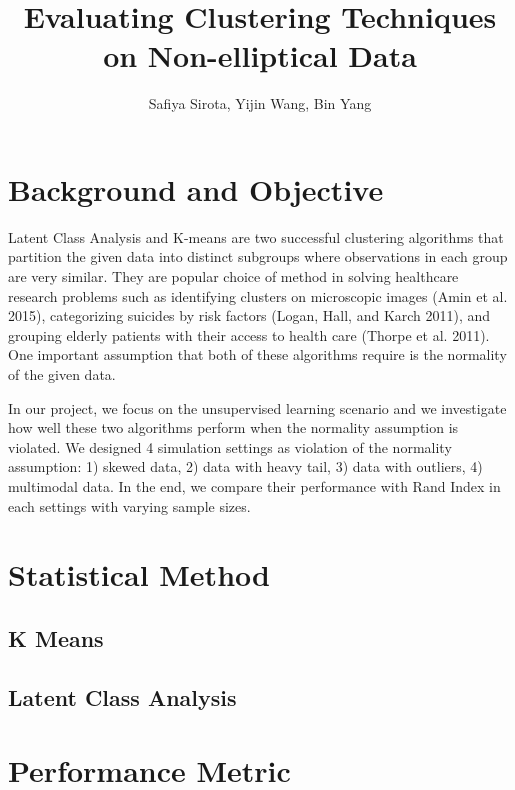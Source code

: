 \documentclass[
]{article}
\title{Evaluating Clustering Techniques on Non-elliptical Data}
\author{Safiya Sirota, Yijin Wang, Bin Yang}
\date{}
\begin{document}
\maketitle

{
\setcounter{tocdepth}{2}
\tableofcontents
}
\hypertarget{background-and-objective}{%
\section{Background and Objective}\label{background-and-objective}}

Latent Class Analysis and K-means are two successful clustering
algorithms that partition the given data into distinct subgroups where
observations in each group are very similar. They are popular choice of
method in solving healthcare research problems such as identifying
clusters on microscopic images (Amin et al. 2015), categorizing suicides
by risk factors (Logan, Hall, and Karch 2011), and grouping elderly
patients with their access to health care (Thorpe et al. 2011). One
important assumption that both of these algorithms require is the
normality of the given data.

In our project, we focus on the unsupervised learning scenario and we
investigate how well these two algorithms perform when the normality
assumption is violated. We designed 4 simulation settings as violation
of the normality assumption: 1) skewed data, 2) data with heavy tail, 3)
data with outliers, 4) multimodal data. In the end, we compare their
performance with Rand Index in each settings with varying sample sizes.

\hypertarget{statistical-method}{%
\section{Statistical Method}\label{statistical-method}}

\hypertarget{k-means}{%
\subsection{K Means}\label{k-means}}

\hypertarget{latent-class-analysis}{%
\subsection{Latent Class Analysis}\label{latent-class-analysis}}

\hypertarget{performance-metric}{%
\section{Performance Metric}\label{performance-metric}}
\end{document}

